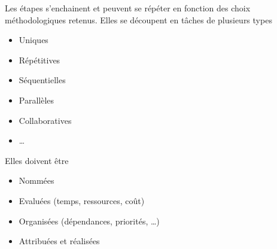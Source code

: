  Les étapes s'enchainent et peuvent se répéter en fonction des choix méthodologiques retenus. Elles se découpent en tâches de plusieurs types
\begin{itemize}
	\item Uniques
	\item Répétitives
	\item Séquentielles
	\item Parallèles
	\item Collaboratives
	\item \ldots
\end{itemize}
Elles doivent être 
\begin{itemize}
	\item Nommées
	\item Evaluées (temps, ressources, coût)
	\item Organisées (dépendances, priorités, \ldots)
	\item Attribuées et réalisées
\end{itemize}
